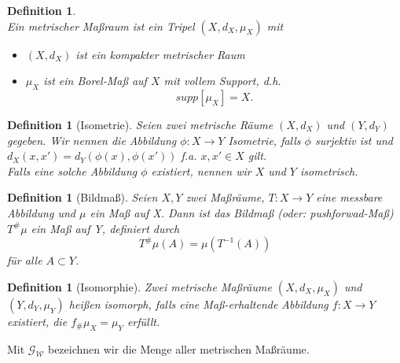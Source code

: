 \documentclass[twoside, 12pt,a4paper]{book}
\def\emph#1{\textit{#1}}
\newtheorem{definition}[theorem]{Definition}
\numberwithin{equation}{section}
\begin{document}
	\begin{definition}\cite{gromov2007metric}\\
		Ein \emph{metrischer Maßraum} ist ein Tripel $(X,d_X,\mu_X)$ mit
		\begin{itemize}
			\item $(X, d_X)$ ist ein kompakter metrischer Raum
			\item $\mu_X$ ist ein Borel-Maß auf $X$ mit vollem Support, d.h. 
			\begin{equation}
			supp[\mu_X] = X.\label{eq:bed_mmspaces}
			\end{equation} 
		\end{itemize}
	\end{definition}
	
	\begin{definition}[Isometrie]
		Seien zwei metrische Räume $(X, d_X)$ und $(Y,d_Y)$ gegeben. Wir nennen die Abbildung $\phi:X \to Y$ Isometrie, falls $\phi$ surjektiv ist und $d_X(x,x')= d_Y(\phi(x),\phi(x'))$ f.a. $x, x' \in X$ gilt. \\
		\noindent Falls eine solche Abbildung $\phi$ existiert, nennen wir $X$ und $Y$ isometrisch.
	\end{definition}
	
	\begin{definition}[Bildmaß]
		Seien $X,Y$ zwei Maßräume, $T: X \to Y$ eine messbare Abbildung und $\mu$ ein Maß auf X. Dann ist das Bildmaß (oder: pushforwad-Maß) $T^\# \mu $ ein Maß auf Y, definiert durch \begin{equation}
		T^\# \mu (A) = \mu (T^{-1}(A))
		\end{equation}
		für alle $A \subset Y$.
	\end{definition}
	
	
	\begin{definition}[Isomorphie]
		Zwei metrische Maßräume $(X,d_X,\mu_X)$ und $(Y,d_Y,\mu_Y)$ heißen isomorph, falls eine Maß-erhaltende Abbildung $f:X \to Y$ existiert, die $f_\#\mu_X = \mu_Y$ erfüllt.
	\end{definition}
	
	\noindent Mit $\mathcal{G}_\mathcal{W}$ bezeichnen wir die Menge aller metrischen Maßräume.
	
\end{document}
